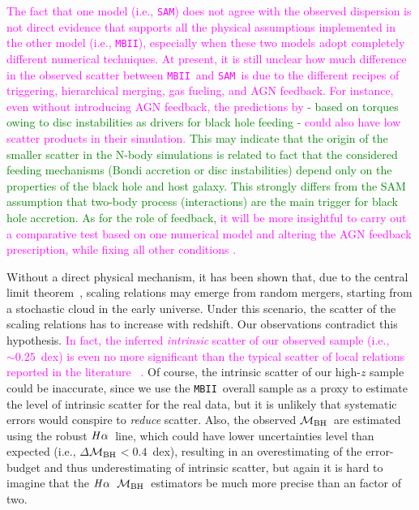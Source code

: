 \documentclass[twocolumn,trackchanges]{aastex63}
\newcommand{\mbh}{$\mathcal M_{\rm BH}$}
\newcommand{\halpha}{${\it H}\alpha$}
\newcommand{\sam}{\texttt{SAM}}
\newcommand{\mbii}{\texttt{MBII}}
\newcommand{\pink}[1]{{ \textcolor{magenta}{#1}}}
\begin{document}
\pink{The fact that one model (i.e., \sam) does not agree with the observed dispersion is not direct evidence that supports all the physical assumptions implemented in the other model (i.e., \mbii), especially when these two models adopt completely different numerical techniques. At present, it is still unclear how much difference in the observed scatter between \mbii\ and \sam\ is due to the different recipes of triggering, hierarchical merging, gas fueling, and AGN feedback. For instance, even without introducing AGN feedback, the predictions by \citet{2017MNRAS.464.2840A} \textcolor{green}{- based on torques owing to disc instabilities as 
 drivers for black hole feeding -} could also have low scatter products in their simulation.}
\textcolor{green}{This may indicate that the origin of the smaller scatter in the N-body simulations is related to fact that the considered feeding mechanisms (Bondi accretion or disc instabilities) depend only on the properties of the black hole and host galaxy. This strongly differs from the SAM assumption that two-body process (interactions) are the main trigger for black hole accretion. As for the role of feedback, }\pink{
it will be more insightful to carry out a comparative test based on one numerical model and altering the AGN feedback prescription, while fixing all other conditions \citep[see][]{Hopkins2009}.
}

Without a direct physical mechanism, it has been shown that, due to the central limit theorem~\citep{Peng2007, Jahnke2011, Hirschmann2010}, scaling relations may emerge from random mergers, starting from a stochastic cloud in the early universe. Under this scenario, the scatter of the scaling relations has to increase with redshift. Our observations contradict this hypothesis.\pink{In fact, the inferred {\it intrinsic} scatter of our observed sample (i.e., $\sim0.25$~dex) is even no more significant than the typical scatter of local relations reported in the literature ~\citep[][i.e., $\gtrsim0.35$~dex]{Kormendy13, Gul++09, Reines2015}.} Of course, the intrinsic scatter of our high-$z$ sample could be inaccurate, since we use the \mbii\ overall sample as a proxy to estimate the level of intrinsic scatter for the real data, but it is unlikely that systematic errors would conspire to {\it reduce} scatter.
Also, the observed \mbh\ are estimated using the robust \halpha\ line, which could have lower uncertainties level than expected (i.e., $\Delta$\mbh$<0.4$~dex), resulting in an overestimating of the error-budget and thus underestimating of intrinsic scatter, but again it is hard to imagine that the \halpha\ \mbh\ estimators be much more precise than an factor of two.
\end{document}

